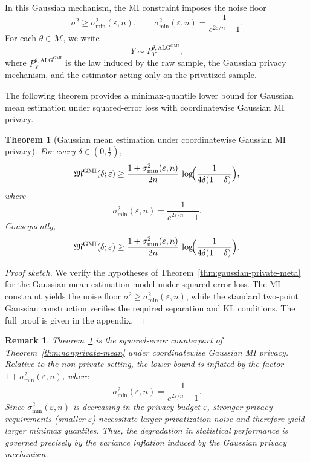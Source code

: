 \documentclass[journal]{IEEEtran}
\newtheorem{theorem}{Theorem}
\newtheorem{remark}{Remark}
\newcommand{\ALG}{\mathrm{ALG}}
\begin{document}
In this Gaussian mechanism, the MI constraint imposes the noise floor
\[
\sigma^2\ge \sigma_{\min}^2(\varepsilon,n),
\qquad
\sigma_{\min}^2(\varepsilon,n)
=
\frac{1}{e^{2\varepsilon/n}-1}.
\]
For each \(\theta\in\mathcal M\), we write
\[
Y\sim P_Y^{\theta,\ALG^{\mathrm{GMI}}},
\]
where \(P_Y^{\theta,\ALG^{\mathrm{GMI}}}\) is the law induced by the raw
sample, the Gaussian privacy mechanism, and the estimator acting only on the
privatized sample.

The following theorem provides a minimax-quantile lower bound for Gaussian mean
estimation under squared-error loss with coordinatewise Gaussian
MI privacy.

\begin{theorem}[Gaussian mean estimation under coordinatewise Gaussian MI privacy]
\label{thm:private-mean}
For every \(\delta\in(0,\tfrac12)\),
\[
\mathfrak M^{\mathrm{GMI}}_-(\delta;\varepsilon)
\ge
\frac{1+\sigma_{\min}^2(\varepsilon,n)}{2n}\,
\log\!\Bigl(\frac{1}{4\delta(1-\delta)}\Bigr),
\]
where
\[
\sigma_{\min}^2(\varepsilon,n)
=
\frac{1}{e^{2\varepsilon/n}-1}.
\]
Consequently,
\[
\mathfrak M^{\mathrm{GMI}}(\delta;\varepsilon)
\ge
\frac{1+\sigma_{\min}^2(\varepsilon,n)}{2n}\,
\log\!\Bigl(\frac{1}{4\delta(1-\delta)}\Bigr).
\]
\end{theorem}

\begin{proof}[Proof sketch]
We verify the hypotheses of Theorem~\ref{thm:gaussian-private-meta} for the
Gaussian mean-estimation model under squared-error loss. The MI constraint
yields the noise floor
\(\sigma^2\ge\sigma_{\min}^2(\varepsilon,n)\), while the standard two-point
Gaussian construction verifies the required separation and KL conditions. The
full proof is given in the appendix.
\end{proof}

\begin{remark}
Theorem~\ref{thm:private-mean} is the squared-error counterpart of
Theorem~\ref{thm:nonprivate-mean} under coordinatewise Gaussian
MI privacy. Relative to the non-private setting, the lower bound is
inflated by the factor \(1+\sigma_{\min}^2(\varepsilon,n)\), where
\[
\sigma_{\min}^2(\varepsilon,n)
=
\frac{1}{e^{2\varepsilon/n}-1}.
\]
Since \(\sigma_{\min}^2(\varepsilon,n)\) is decreasing in the privacy budget
\(\varepsilon\), stronger privacy requirements (smaller \(\varepsilon\))
necessitate larger privatization noise and therefore yield larger minimax
quantiles. Thus, the degradation in statistical performance is governed
precisely by the variance inflation induced by the Gaussian privacy mechanism.
\end{remark}
\end{document}
